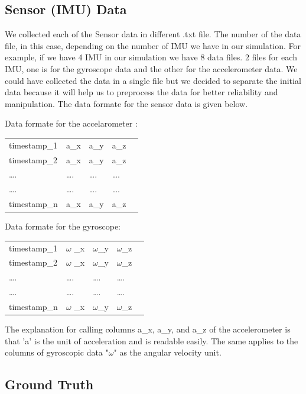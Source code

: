 \subsection{Sensor (IMU) Data}
We collected each of the Sensor data in different .txt file. The number of the data file, in this case, depending on the number of IMU we have in our simulation. For example, if we have 4 IMU in our simulation we have 8 data files. 2 files for each IMU, one is for the gyroscope data and the other for the accelerometer data. We could have collected the data in a single file but we decided to separate the initial data because it will help us to preprocess the data for better reliability and manipulation. The data formate for the sensor data is given below.

Data formate for the accelarometer :
\begin{table}[h]
\begin{tabular}{lllll}
 timestamp\_1 & a\_x &  a\_y &  a\_z  \\
 timestamp\_2 & a\_x &  a\_y &  a\_z   \\
…. & …. &  …. & ….  \\
…. & …. &  …. & ….  \\
 timestamp\_n & a\_x &  a\_y &  a\_z 
\end{tabular}
\end{table}



Data formate for the gyroscope:

\begin{table}[h]
\begin{tabular}{lllll}
 timestamp\_1 & $ \omega $ \_x &   $ \omega $\_y &   $ \omega $\_z  \\
 timestamp\_2 & $ \omega $ \_x &   $ \omega $\_y &   $ \omega $\_z  \\
…. & …. &  …. & ….  \\
…. & …. &  …. & ….  \\
 timestamp\_n & $ \omega $ \_x &   $ \omega $\_y &   $ \omega $\_z 
\end{tabular}
\end{table}



The explanation for calling columns a\_x, a\_y, and a\_z of the accelerometer is that 'a' is the unit of acceleration and is readable easily. The same applies to the columns of gyroscopic data "$ \omega $" as the angular velocity unit.

\subsection{Ground Truth}

